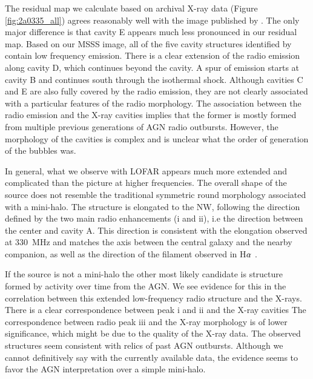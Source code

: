 \documentclass{aa}  %
\begin{document}
The residual map we calculate based on archival X-ray data (Figure \ref{fig:2a0335_all}) agrees reasonably well with the image published by \cite{Sanders2009}. 
The only major difference is that cavity E appears much less pronounced in our residual map.
Based on our MSSS image, all of the five cavity structures identified by \cite{Sanders2009} contain low frequency emission.
There is a clear extension of the radio emission along cavity D, which continues beyond the cavity.
A spur of emission starts at cavity B and continues south through the isothermal shock.
Although cavities C and E are also fully covered by the radio emission, they are not clearly associated with a particular features of the radio morphology. 
The association between the radio emission and the X-ray cavities implies that the former is mostly formed from multiple previous generations of AGN radio outbursts.
However, the morphology of the cavities is complex and is unclear what the order of generation of the bubbles was. 

In general, what we observe with LOFAR appears much more extended and complicated than the picture at higher frequencies. 
The overall shape of the source does not resemble the traditional symmetric round morphology associated with a mini-halo.
The structure is elongated to the NW, following the direction defined by the two main radio enhancements (i and ii), i.e the direction between the center and cavity A.
This direction is consistent with the elongation observed at 330~MHz 
and matches the axis between the central galaxy and the nearby companion, as well as the direction of the filament observed in H$\rm{\alpha}$ \citep{Sanders2009}.

If the source is not a mini-halo the other most likely candidate is structure formed by activity over time from the AGN.
We see evidence for this in the correlation between this extended low-frequency radio structure and the X-rays.
There is a clear correspondence between peak i and ii and the X-ray cavities
The correspondence between radio peak iii and the X-ray morphology is of lower significance, which might be due to the quality of the X-ray data.
The observed structures seem consistent with relics of past AGN outbursts.
Although we cannot definitively say with the currently available data, the evidence seems to favor the AGN interpretation over a simple mini-halo.
\end{document}
